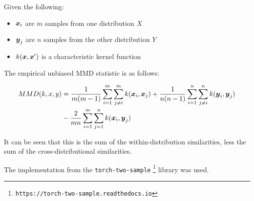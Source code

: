 Given the following:

\begin{itemize}
    \item $\boldsymbol{x}_i$ are $m$ samples from one distribution  $X$
    \item $\boldsymbol{y}_j$ are $n$ samples from the other distribution $Y$
    \item $k(\boldsymbol{x}, \boldsymbol{x}')$ is a characteristic kernel function
\end{itemize}

The empirical unbiased MMD statistic is as follows:

\begin{equation}
\label{eq:mmd}
\begin{split}
MMD (k, x, y) &= \frac{1}{m(m-1)} \sum_{i=1}^m \sum_{j \neq i}^m k(\boldsymbol{x}_i, \boldsymbol{x}_j) + \frac{1}{n(n-1)} \sum_{i=1}^n \sum_{j \neq i}^n k(\boldsymbol{y}_i, \boldsymbol{y}_j) \\
&- \frac{2}{mn} \sum_{i=1}^m \sum_{j=1}^n k(\boldsymbol{x}_i, \boldsymbol{y}_j)
\end{split}
\end{equation}

It can be seen that this is the sum of the within-distribution similarities, less the sum of the cross-distributional similarities. 


The implementation from the \texttt{torch-two-sample} \footnote{\texttt{https://torch-two-sample.readthedocs.io}} library \cite{torchtwosample} was used.  



